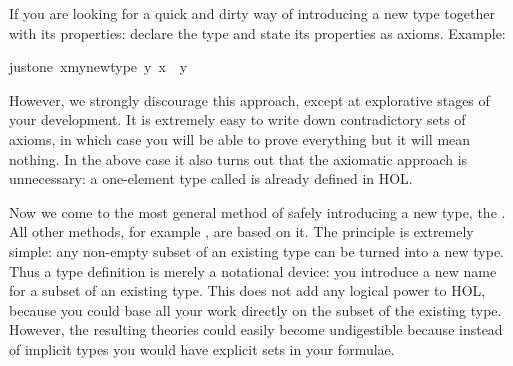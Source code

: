 \begin{isabellebody}
\begin{isamarkuptext}
If you are looking for a quick and dirty way of introducing a new type
together with its properties: declare the type and state its properties as
axioms. Example:%
\end{isamarkuptext}%
\isanewline
just{\isacharunderscore}one{\isacharcolon}\ {\isachardoublequote}{\isasymexists}x{\isacharcolon}{\isacharcolon}my{\isacharunderscore}new{\isacharunderscore}type{\isachardot}\ {\isasymforall}y{\isachardot}\ x\ {\isacharequal}\ y{\isachardoublequote}%
\begin{isamarkuptext}%
\noindent
However, we strongly discourage this approach, except at explorative stages
of your development. It is extremely easy to write down contradictory sets of
axioms, in which case you will be able to prove everything but it will mean
nothing.  In the above case it also turns out that the axiomatic approach is
unnecessary: a one-element type called  is already defined in HOL.%
\end{isamarkuptext}%
%
%
\begin{isamarkuptext}%
\label{sec:typedef}
Now we come to the most general method of safely introducing a new type, the
. All other methods, for example
, are based on it. The principle is extremely simple:
any non-empty subset of an existing type can be turned into a new type.  Thus
a type definition is merely a notational device: you introduce a new name for
a subset of an existing type. This does not add any logical power to HOL,
because you could base all your work directly on the subset of the existing
type. However, the resulting theories could easily become undigestible
because instead of implicit types you would have explicit sets in your
formulae.


\end{isamarkuptext}
\end{isabellebody}
